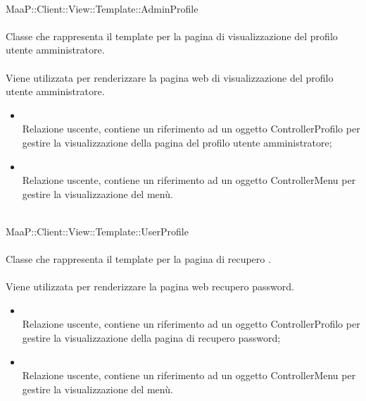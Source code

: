 \\
MaaP::Client::View::Template::AdminProfile\\
\\
Classe che rappresenta il template per la pagina di visualizzazione del profilo utente amministratore.\\
\\
Viene utilizzata per renderizzare la pagina web di visualizzazione del profilo utente amministratore.\\
\begin{itemize}
\item{}\\
Relazione uscente, contiene un riferimento ad un oggetto ControllerProfilo per gestire la visualizzazione della pagina del profilo utente amministratore;
\item{}\\
Relazione uscente, contiene un riferimento ad un oggetto ControllerMenu per gestire la visualizzazione del menù.
\end{itemize}

\\
MaaP::Client::View::Template::UserProfile\\
\\
Classe che rappresenta il template per la pagina di recupero .\\
\\
Viene utilizzata per renderizzare la pagina web recupero password.
\begin{itemize}
\item{}\\
Relazione uscente, contiene un riferimento ad un oggetto ControllerProfilo per gestire la visualizzazione della pagina di recupero password;
\item{}\\
Relazione uscente, contiene un riferimento ad un oggetto ControllerMenu per gestire la visualizzazione del menù.
\end{itemize}


